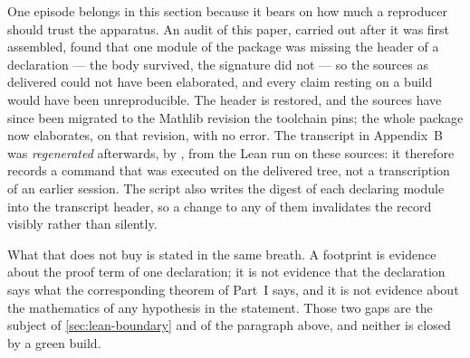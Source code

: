 One episode belongs in this section because it bears on how much a reproducer should
trust the apparatus. An audit of this paper, carried out after it was first
assembled, found that one module of the package was missing the header of a
declaration --- the body survived, the signature did not --- so the sources as
delivered could not have been elaborated, and every claim resting on a build would
have been unreproducible. The header is restored, and the sources have since been
migrated to the Mathlib revision the toolchain pins; the whole package now
elaborates, on that revision, with no error. The transcript in Appendix~B was
\emph{regenerated} afterwards, by , from the Lean
run on these sources: it therefore records a command that was executed on the
delivered tree, not a transcription of an earlier session. The script also writes
the digest of each declaring module into the transcript header, so a change to any
of them invalidates the record visibly rather than silently.

What that does not buy is stated in the same breath. A footprint is evidence about
the proof term of one declaration; it is not evidence that the declaration says
what the corresponding theorem of Part~I says, and it is not evidence about the
mathematics of any hypothesis in the statement. Those two gaps are the subject of
\cref{sec:lean-boundary} and of the paragraph above, and neither is closed by a
green build.
